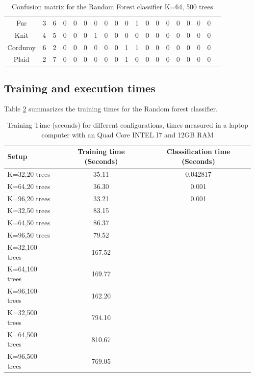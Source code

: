 \documentclass[10pt,twocolumn,letterpaper]{article}
\begin{document}
\begin{table}[t]
\begin{tabular}{c | c | c |c |c |c |c |c |c |c |c |c |c |c |c |c |c | c | c }
Fur &   3   &  6   &  0   &  0   &  0   &  0   &  0   &  0  &   0   &  1   &  0  &   0  &   0  &   0   &  0  &   0   &  0\\
Knit &  4   &  5   &  0   &  0   &  0   &  1   &  0   &  0  &   0   &  0   &  0  &   0  &   0  &   0   &  0  &   0   &  0\\
Corduroy &   6   & 2   &  0    & 0    & 0    & 0    & 0    & 0   &  1    & 1    & 0    & 0   &  0   &  0    & 0   &  0   &  0\\
Plaid &   2   &  7  &   0   &  0   &  0   &  0   &  0   &  0   &  1   &  0   &  0   &  0   &  0  &   0   &  0  &   0  &   0\\
\end{tabular}
\caption{Confusion matrix for the Random Forest classifier K=64, 500 trees}
\label{table:table4}
\end{table}

\subsection{Training and execution times}
Table \ref{table:times} summarizes the training times for the Random forest classifier.

\begin{table}[t]
\centering
\begin{tabular}{ l | c | c}
Setup & Training time (Seconds) & Classification time (Seconds)    \\
\hline	
K=32,20 trees & 35.11 & 0.042817\\
K=64,20 trees &   36.30 & 0.001 \\
K=96,20 trees &  33.21  & 0.001 \\
K=32,50 trees & 83.15  \\
K=64,50 trees &  86.37 \\
K=96,50 trees &   79.52 \\
K=32,100 trees &  167.52 \\
K=64,100 trees &  169.77  \\
K=96,100 trees &  162.20\\
K=32,500 trees &  794.10 \\
K=64,500 trees &  810.67 \\
K=96,500 trees &  769.05 \\

\end{tabular}
\caption{Training Time (seconds) for different configurations, times measured in a laptop computer with an Quad Core INTEL I7 and 12GB RAM}
\label{table:times}
\end{table}
\end{document}
